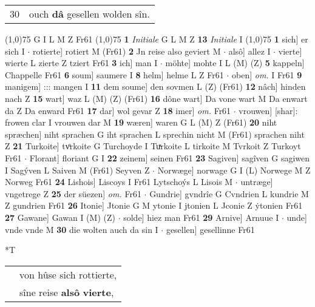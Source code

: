 \documentclass[8pt,a4paper,notitlepage]{article}
\begin{document}
\begin{table}[ht]
\begin{minipage}[t]{0.5\linewidth}
\begin{tabular}{rl}
30 & ouch \textbf{dâ} gesellen wolden sîn.\\ 
\end{tabular}
\scriptsize
\line(1,0){75} \newline
G I L M Z Fr61 \newline
\line(1,0){75} \newline
\textbf{1} \textit{Initiale} G L M Z  \textbf{13} \textit{Initiale} I  \newline
\line(1,0){75} \newline
\textbf{1} sich] er sich I  $\cdot$ rotierte] rotiert M (Fr61) \textbf{2} Jn reise also geviert M  $\cdot$ alsô] allez I  $\cdot$ vierte] wierte L zierte Z tziert Fr61 \textbf{3} ich] man I  $\cdot$ möhte] mohte I L (M) (Z) \textbf{5} kappeln] Chappelle Fr61 \textbf{6} soum] saumere I \textbf{8} helm] helme L Z Fr61  $\cdot$ oben] \textit{om.} I Fr61 \textbf{9} manigem] ::: mangen I \textbf{11} dem soume] den sovmen L (Z) (Fr61) \textbf{12} nâch] hinden nach Z \textbf{15} wart] waz L (M) (Z) (Fr61) \textbf{16} dône wart] Da vone wart M Da enwart da Z Da enward Fr61 \textbf{17} dar] wol gevar Z \textbf{18} imer] \textit{om.} Fr61  $\cdot$ vrouwen] [shar]: frowen clar I vrouwen dar M \textbf{19} wæren] waren G L (M) Z (Fr61) \textbf{20} niht spræchen] niht sprachen G iht sprachen L sprechin nicht M (Fr61) sprachen niht Z \textbf{21} Turkoite] tvͦrkoite G Turchoyde I Tuͯrkoite L tirkoite M Tvrkoit Z Turkoyt Fr61  $\cdot$ Florant] floriant G I \textbf{22} zeinem] seinen Fr61 \textbf{23} Sagiven] sagîven G sagiwen I Sagýven L Saiven M (Fr61) Seyven Z  $\cdot$ Norwæge] norwage G I (L) Norwege M Z Norweg Fr61 \textbf{24} Lishois] Liscoys I Fr61 Lytschoýs L Lisois M  $\cdot$ untræge] vngetrege Z \textbf{25} der süezen] \textit{om.} Fr61  $\cdot$ Gundrie] gvndrîe G Cvndrien L kundrie M Z gundrien Fr61 \textbf{26} Itonie] Jtonie G M ytonie I jtonien L Jconie Z ẏtonien Fr61 \textbf{27} Gawane] Gawan I (M) (Z)  $\cdot$ solde] hiez man Fr61 \textbf{29} Arnive] Arnuue I  $\cdot$ unde] vnde vnde M \textbf{30} die wolten auch da sin I  $\cdot$ gesellen] gesellinne Fr61 \newline
\end{minipage}
\hspace{0.5cm}
\begin{minipage}[t]{0.5\linewidth}
\small
\begin{center}*T
\end{center}
\begin{tabular}{rl}
 & von hûse sich rottierte,\\ 
 & sîne reise \textbf{alsô} \textbf{vierte},\\ 

\end{tabular}
\end{minipage}
\end{table}
\end{document}
